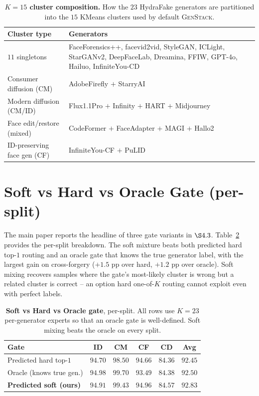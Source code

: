 \documentclass[10pt,twocolumn,letterpaper]{article}
\begin{document}
\begin{table}[t]
\centering
\footnotesize
\setlength{\tabcolsep}{3pt}
\renewcommand{\arraystretch}{1.15}
\caption{\textbf{$K{=}15$ cluster composition.} How the $23$ HydraFake generators are partitioned into the $15$ KMeans clusters used by default \textsc{GenStack}.}
\label{tab:clusters}
\begin{tabular}{p{} p{}}
\toprule
Cluster type & Generators \\
\midrule
$11$ singletons & FaceForensics++, facevid2vid, StyleGAN, ICLight, StarGANv2, DeepFaceLab, Dreamina, FFIW, GPT-4o, Hailuo, InfiniteYou-CD \\
\midrule
Consumer diffusion (CM)       & AdobeFirefly $+$ StarryAI \\
Modern diffusion (CM/ID)      & Flux1.1Pro $+$ Infinity $+$ HART $+$ Midjourney \\
Face edit/restore (mixed)     & CodeFormer $+$ FaceAdapter $+$ MAGI $+$ Hallo2 \\
ID-preserving face gen (CF)   & InfiniteYou-CF $+$ PuLID \\
\bottomrule
\end{tabular}
\end{table}

\section{Soft vs Hard vs Oracle Gate (per-split)}
\label{sec:gate_compare}

The main paper reports the headline of three gate variants in $\S 4.3$. Table~\ref{tab:gate_compare} provides the per-split breakdown. The soft mixture beats both predicted hard top-$1$ routing and an oracle gate that knows the true generator label, with the largest gain on cross-forgery ($+1.5$ pp over hard, $+1.2$ pp over oracle). Soft mixing recovers samples where the gate's most-likely cluster is wrong but a related cluster is correct -- an option hard one-of-$K$ routing cannot exploit even with perfect labels.

\begin{table}[t]
\centering
\footnotesize
\setlength{\tabcolsep}{4pt}
\caption{\textbf{Soft vs Hard vs Oracle gate}, per-split. All rows use $K{=}23$ per-generator experts so that an oracle gate is well-defined. Soft mixing beats the oracle on every split.}
\label{tab:gate_compare}
\begin{tabular}{l c c c c c}
\toprule
Gate & ID & CM & CF & CD & Avg \\
\midrule
Predicted hard top-$1$    & $94.70$ & $98.50$ & $94.66$ & $84.36$ & $92.45$ \\
Oracle (knows true gen.)  & $94.98$ & $99.70$ & $93.49$ & $84.38$ & $92.50$ \\
\textbf{Predicted soft (ours)} & $\mathbf{94.91}$ & $\mathbf{99.43}$ & $\mathbf{94.96}$ & $\mathbf{84.57}$ & $\mathbf{92.83}$ \\
\bottomrule
\end{tabular}
\end{table}
\end{document}

